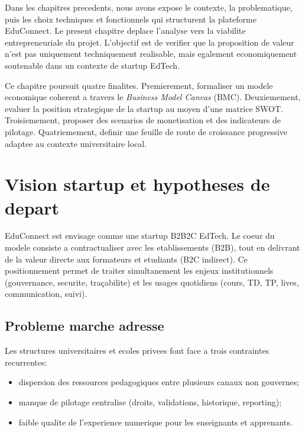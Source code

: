 ﻿\documentclass[12pt,a4paper,oneside]{report}
\begin{document}
Dans les chapitres precedents, nous avons expose le contexte, la problematique, puis les choix techniques et fonctionnels qui structurent la plateforme EduConnect. Le present chapitre deplace l'analyse vers la viabilite entrepreneuriale du projet. L'objectif est de verifier que la proposition de valeur n'est pas uniquement techniquement realisable, mais egalement economiquement soutenable dans un contexte de startup EdTech.

Ce chapitre poursuit quatre finalites. Premierement, formaliser un modele economique coherent a travers le \textit{Business Model Canvas} (BMC)\cite{osterwalder2010bmc}. Deuxiemement, evaluer la position strategique de la startup au moyen d'une matrice SWOT\cite{kotler2017marketing}. Troisiemement, proposer des scenarios de monetisation et des indicateurs de pilotage. Quatriemement, definir une feuille de route de croissance progressive adaptee au contexte universitaire local.

\section{Vision startup et hypotheses de depart}

EduConnect est envisage comme une startup B2B2C EdTech. Le coeur du modele consiste a contractualiser avec les etablissements (B2B), tout en delivrant de la valeur directe aux formateurs et etudiants (B2C indirect). Ce positionnement permet de traiter simultanement les enjeux institutionnels (gouvernance, securite, traçabilite) et les usages quotidiens (cours, TD, TP, lives, communication, suivi).

\subsection{Probleme marche adresse}

Les structures universitaires et ecoles privees font face a trois contraintes recurrentes:
\begin{itemize}
  \item dispersion des ressources pedagogiques entre plusieurs canaux non gouvernes;
  \item manque de pilotage centralise (droits, validations, historique, reporting);
  \item faible qualite de l'experience numerique pour les enseignants et apprenants.
\end{itemize}
\end{document}
